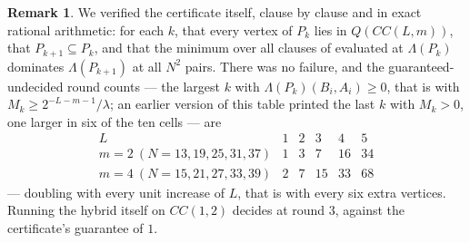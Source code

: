 \documentclass[11pt]{article}
\theoremstyle{plain}
\theoremstyle{definition}
\newtheorem{remark}[theorem]{Remark}
\begin{document}
\begin{remark}\label{rem:hybrid-lower-verified}
We verified the certificate itself, clause by clause and in exact rational
arithmetic: for each $k$, that every vertex of $P_k$ lies in $Q(CC(L,m))$, that
$P_{k+1}\subseteq P_k$, and that the minimum over all clauses of
 evaluated at $\Lambda(P_k)$ dominates $\Lambda(P_{k+1})$ at all
$N^{2}$ pairs. There was no failure, and the guaranteed-undecided round counts --- the
largest $k$ with $\Lambda(P_k)(B_i,A_i)\ge0$, that is with
$M_k\ge2^{-L-m-1}/\lambda$; an earlier version of this table printed the
last $k$ with $M_k>0$, one larger in six of the ten cells --- are
\[
  \begin{array}{l|ccccc}
    L & 1 & 2 & 3 & 4 & 5\\\hline
    m=2\ (N=13,19,25,31,37) & 1 & 3 & 7 & 16 & 34\\
    m=4\ (N=15,21,27,33,39) & 2 & 7 & 15 & 33 & 68
  \end{array}
\]
--- doubling with every unit increase of $L$, that is with every six extra
vertices. Running the hybrid itself on $CC(1,2)$ decides at round $3$, against
the certificate's guarantee of $1$.
\end{remark}
\end{document}
